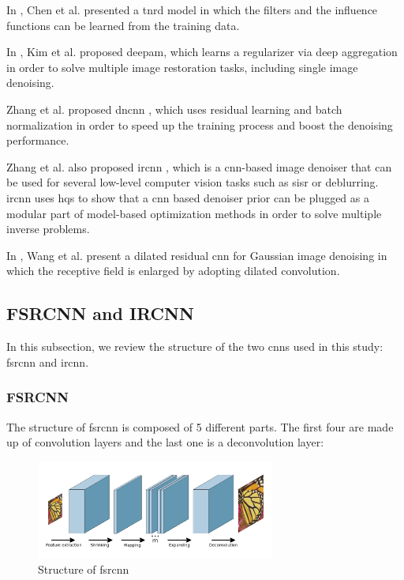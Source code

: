 In \cite{TNRD}, Chen et al. presented a  \gls{tnrd} model in which the filters and the influence functions can be learned from the training data. 

In \cite{DEEPAM}, Kim et al. proposed \gls{deepam}, which learns a regularizer via deep aggregation in order to solve multiple image restoration tasks, including single image denoising.  

Zhang et al. proposed \gls{dncnn} \cite{DNCNN}, which uses residual learning and batch normalization in order to speed up the training process and boost the denoising performance.

Zhang et al. also proposed \gls{ircnn} \cite{IRCNN}, which is a \gls{cnn}-based image denoiser that can be used for several low-level computer vision tasks such as \gls{sisr} or deblurring. \gls{ircnn} uses \gls{hqs} to show that a \gls{cnn} based denoiser prior can be plugged as a modular part of model-based optimization methods in order to solve multiple inverse problems.

In \cite{DILATED}, Wang et al. present a dilated residual \gls{cnn} for Gaussian image denoising in which the receptive field is enlarged by adopting dilated convolution.

\newpage
\subsection{FSRCNN and IRCNN}
In this subsection, we review the structure of the two \glspl{cnn} used in this study: \gls{fsrcnn} and \gls{ircnn}.

\subsubsection{FSRCNN} The structure of \gls{fsrcnn} is composed of 5 different parts. The first four are made up of convolution layers and the last one is a deconvolution layer:

\begin{figure}
	\centering
	\includegraphics[width=0.7\textwidth]{images/fsrcnn.png}
	\caption{Structure of \gls{fsrcnn}}
	\label{fig:fsrcnn}
\end{figure}


